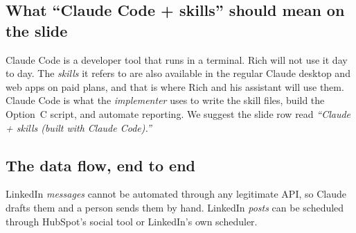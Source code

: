 \documentclass[11pt]{article}
\begin{document}
\subsection{What ``Claude Code + skills'' should mean on the slide}
Claude Code is a developer tool that runs in a terminal. Rich will not use it day to day. The
\emph{skills} it refers to are also available in the regular Claude desktop and web apps on
paid plans, and that is where Rich and his assistant will use them. Claude Code is
what the \emph{implementer} uses to write the skill files, build the Option~C script, and
automate reporting. We suggest the slide row read \emph{``Claude + skills (built with Claude
Code).''}

\subsection{The data flow, end to end}
\begin{center}
\small
{}
\end{center}
LinkedIn \emph{messages} cannot be automated through any legitimate API, so Claude drafts them
and a person sends them by hand. LinkedIn \emph{posts} can be scheduled through HubSpot's social
tool or LinkedIn's own scheduler.

\end{document}
